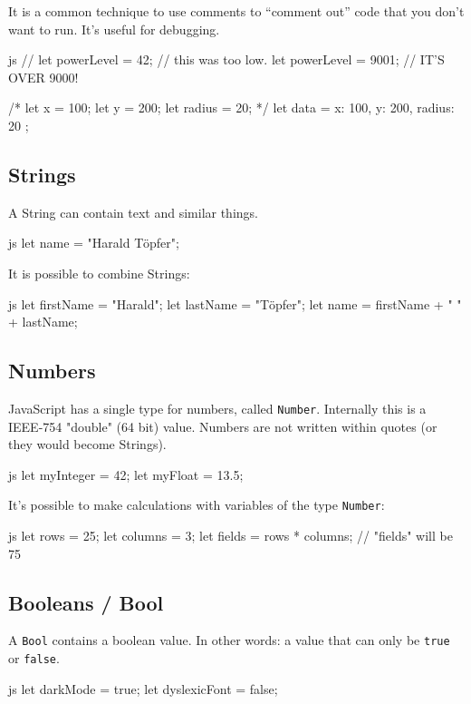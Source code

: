 \documentclass[10pt,a4paper]{article}
\begin{document}
\begin{multicols}{3}
It is a common technique to use comments to \enquote{comment out} code that you don't want to run. It's useful for debugging.
\begin{codebox}{js}{}
  // let powerLevel = 42; // this was too low.
  let powerLevel = 9001; // IT'S OVER 9000!

  /*
  let x = 100;
  let y = 200;
  let radius = 20;
  */
  let data = {
    x: 100,
    y: 200,
    radius: 20
  };
\end{codebox}

\subsection*{Strings}
A String can contain text and similar things.
\begin{codebox}{js}{}
  let name = "Harald Töpfer";
\end{codebox}
It is possible to combine Strings:
\begin{codebox}{js}{}
  let firstName = "Harald";
  let lastName = "Töpfer";
  let name = firstName + " " + lastName;
\end{codebox}

\subsection*{Numbers}
JavaScript has a single type for numbers, called \texttt{Number}. Internally this is a IEEE-754 "double" (64 bit) value. Numbers are not written within quotes (or they would become Strings).

\begin{codebox}{js}{}
  let myInteger = 42;
  let myFloat = 13.5;
\end{codebox}
It's possible to make calculations with variables of the type \texttt{Number}:
\begin{codebox}{js}{}
  let rows = 25;
  let columns = 3;
  let fields = rows * columns; // "fields" will be 75
\end{codebox}

\subsection*{Booleans / Bool}
A \texttt{Bool} contains a boolean value. In other words: a value that can only be \texttt{true} or \texttt{false}.
\begin{codebox}{js}{}
  let darkMode = true;
  let dyslexicFont = false;
\end{codebox}



\end{multicols}
\end{document}
